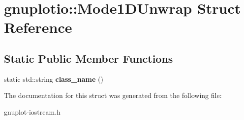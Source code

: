 \hypertarget{structgnuplotio_1_1Mode1DUnwrap}{}\section{gnuplotio\+:\+:Mode1\+D\+Unwrap Struct Reference}
\label{structgnuplotio_1_1Mode1DUnwrap}
\subsection*{Static Public Member Functions}
\begin{DoxyCompactItemize}
\item 
\mbox{\label{structgnuplotio_1_1Mode1DUnwrap_a2350096ad4d8b668f6df56c32cab69b6}} 
static std\+::string {\bfseries class\+\_\+name} ()
\end{DoxyCompactItemize}


The documentation for this struct was generated from the following file\+:\begin{DoxyCompactItemize}
\item 
gnuplot-\/iostream.\+h\end{DoxyCompactItemize}

